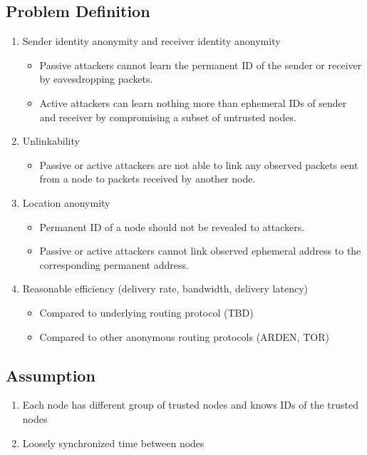 \documentclass[11pt]{article}
\begin{document}
\subsection{Problem Definition}
\label{problem}
\begin{enumerate}
\item Sender identity anonymity and receiver identity anonymity
  \begin{itemize}
  \item Passive attackers cannot learn the permanent ID of the sender or receiver by eavesdropping packets. 
  \item Active attackers can learn nothing more than ephemeral IDs of sender and receiver by compromising a subset of untrusted nodes. 
  \end{itemize}

\item Unlinkability
  \begin{itemize}
  \item Passive or active attackers are not able to link any observed packets sent from a node to packets received by another node.   
  \end{itemize}

\item Location anonymity 
  \begin{itemize}
  \item Permanent ID of a node should not be revealed to attackers.
  \item Passive or active attackers cannot link observed ephemeral address to the corresponding permanent address.
  \end{itemize}

\item Reasonable efficiency (delivery rate, bandwidth, delivery latency)
	\begin{itemize}
	\item Compared to underlying routing protocol (TBD)
	\item Compared to other anonymous routing protocols (ARDEN, TOR)
	\end{itemize}

\end{enumerate}


\subsection{Assumption}
\begin{enumerate}
\item Each node has different group of trusted nodes and knows IDs of the trusted nodes
\item Loosely synchronized time between nodes
\end{enumerate}
\end{document}
